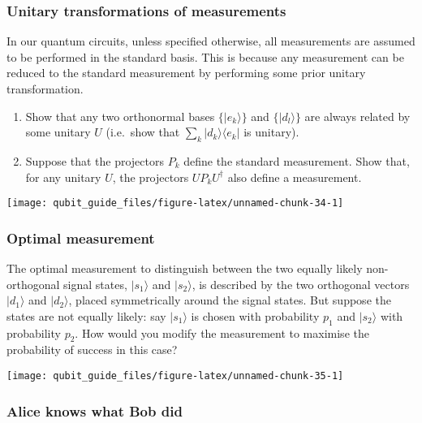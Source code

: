 \documentclass[fleqn]{article}
\begin{document}
\hypertarget{unitary-transformations-of-measurements}{%
\subsubsection{Unitary transformations of measurements}\label{unitary-transformations-of-measurements}}

In our quantum circuits, unless specified otherwise, all measurements are assumed to be performed in the standard basis.
This is because any measurement can be reduced to the standard measurement by performing some prior unitary transformation.

\begin{enumerate}
\def\labelenumi{\arabic{enumi}.}
\item
  Show that any two orthonormal bases \(\{|e_k\rangle\}\) and \(\{|d_l\rangle\}\) are always related by some unitary \(U\) (i.e.~show that \(\sum_k |d_k\rangle\langle e_k|\) is unitary).
\item
  Suppose that the projectors \(P_k\) define the standard measurement.
  Show that, for any unitary \(U\), the projectors \(UP_kU^\dagger\) also define a measurement.
\end{enumerate}

\begin{center}\texttt{[image: qubit\_guide\_files/figure-latex/unnamed-chunk-34-1]} \end{center}

\hypertarget{optimal-measurement}{%
\subsubsection{Optimal measurement}\label{optimal-measurement}}

The optimal measurement to distinguish between the two equally likely non-orthogonal signal states, \(|s_1\rangle\) and \(|s_2\rangle\), is described by the two orthogonal vectors \(|d_1\rangle\) and \(|d_2\rangle\), placed symmetrically around the signal states.
But suppose the states are not equally likely: say \(|s_1\rangle\) is chosen with probability \(p_1\) and \(|s_2\rangle\) with probability \(p_2\).
How would you modify the measurement to maximise the probability of success in this case?

\begin{center}\texttt{[image: qubit\_guide\_files/figure-latex/unnamed-chunk-35-1]} \end{center}

\hypertarget{alice-knows-what-bob-did}{%
\subsubsection{Alice knows what Bob did}\label{alice-knows-what-bob-did}}
\end{document}
